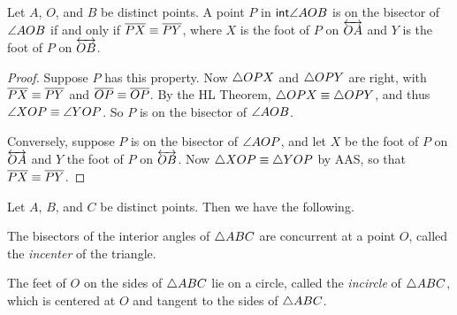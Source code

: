 \begin{prop}
Let \(A\), \(O\), and \(B\) be distinct points.
A point \(P\) in \(\mathsf{int}\angle{AOB}\) is on the bisector of \(\angle{AOB}\) if and only if \(\overline{PX} \equiv \overline{PY}\), where \(X\) is the foot of \(P\) on \(\overleftrightarrow{OA}\) and \(Y\) is the foot of \(P\) on \(\overleftrightarrow{OB}\).
\end{prop}

\begin{proof}
Suppose \(P\) has this property.
Now \(\bigtriangleup{OPX}\) and \(\bigtriangleup{OPY}\) are right, with \(\overline{PX} \equiv \overline{PY}\) and \(\overline{OP} \equiv \overline{OP}\).
By the HL Theorem, \(\bigtriangleup{OPX} \equiv \bigtriangleup{OPY}\), and thus \(\angle{XOP} \equiv \angle{YOP}\).
So \(P\) is on the bisector of \(\angle{AOB}\).

Conversely, suppose \(P\) is on the bisector of \(\angle{AOP}\), and let \(X\) be the foot of \(P\) on \(\overleftrightarrow{OA}\) and \(Y\) the foot of \(P\) on \(\overleftrightarrow{OB}\).
Now \(\bigtriangleup{XOP} \equiv \bigtriangleup{YOP}\) by AAS, so that \(\overline{PX} \equiv \overline{PY}\).
\end{proof}

\begin{construct}
Let \(A\), \(B\), and \(C\) be distinct points.
Then we have the following.
\begin{proplist}
\item The bisectors of the interior angles of \(\bigtriangleup{ABC}\) are concurrent at a point \(O\), called the \emph{incenter} of the triangle.

\item The feet of \(O\) on the sides of \(\bigtriangleup{ABC}\) lie on a circle, called the \emph{incircle} of \(\bigtriangleup{ABC}\), which is centered at \(O\) and tangent to the sides of \(\bigtriangleup{ABC}\).
\end{proplist}
\end{construct}

